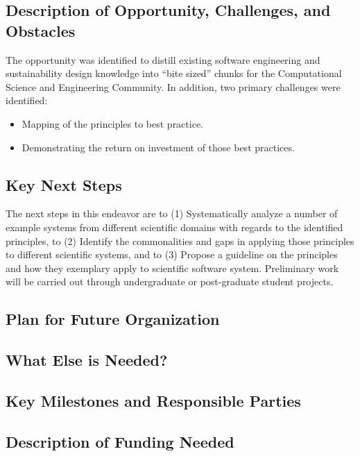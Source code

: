 \subsection{Description of Opportunity, Challenges, and Obstacles}
The opportunity was identified to distill existing software engineering and sustainability design knowledge into ``bite sized'' chunks for the Computational Science and Engineering Community. In addition, two primary challenges were identified: 
\begin{itemize}
\item Mapping of the principles to best practice.
\item Demonstrating the return on investment of those best practices.
\end{itemize}

\subsection{Key Next Steps}
The next steps in this endeavor are to (1) Systematically analyze a number of example systems from different scientific domains with regards to the identified principles, to (2) Identify the commonalities and gaps in applying those principles to different scientific systems, and to (3) Propose a guideline on the principles and how they exemplary apply to scientific software system. Preliminary work will be carried out through undergraduate or post-graduate student projects.

\subsection{Plan for Future Organization}


\subsection{What Else is Needed?}


\subsection{Key Milestones and Responsible Parties}


\subsection{Description of Funding Needed}

